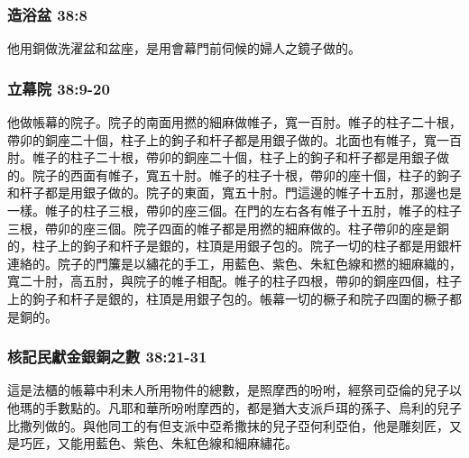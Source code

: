 \begin{table}
\subsubsection{造浴盆 38:8}
他用銅做洗濯盆和盆座，是用會幕門前伺候的婦人之鏡子做的。

\subsubsection{立幕院 38:9-20}

他做帳幕的院子。院子的南面用撚的細麻做帷子，寬一百肘。帷子的柱子二十根，帶卯的銅座二十個，柱子上的鉤子和杆子都是用銀子做的。北面也有帷子，寬一百肘。帷子的柱子二十根，帶卯的銅座二十個，柱子上的鉤子和杆子都是用銀子做的。院子的西面有帷子，寬五十肘。帷子的柱子十根，帶卯的座十個，柱子的鉤子和杆子都是用銀子做的。院子的東面，寬五十肘。門這邊的帷子十五肘，那邊也是一樣。帷子的柱子三根，帶卯的座三個。在門的左右各有帷子十五肘，帷子的柱子三根，帶卯的座三個。院子四面的帷子都是用撚的細麻做的。柱子帶卯的座是銅的，柱子上的鉤子和杆子是銀的，柱頂是用銀子包的。院子一切的柱子都是用銀杆連絡的。院子的門簾是以繡花的手工，用藍色、紫色、朱紅色線和撚的細麻織的，寬二十肘，高五肘，與院子的帷子相配。帷子的柱子四根，帶卯的銅座四個，柱子上的鉤子和杆子是銀的，柱頂是用銀子包的。帳幕一切的橛子和院子四圍的橛子都是銅的。

\subsubsection{核記民獻金銀銅之數 38:21-31}

這是法櫃的帳幕中利未人所用物件的總數，是照摩西的吩咐，經祭司亞倫的兒子以他瑪的手數點的。凡耶和華所吩咐摩西的，都是猶大支派戶珥的孫子、烏利的兒子比撒列做的。與他同工的有但支派中亞希撒抹的兒子亞何利亞伯，他是雕刻匠，又是巧匠，又能用藍色、紫色、朱紅色線和細麻繡花。


\end{table}
